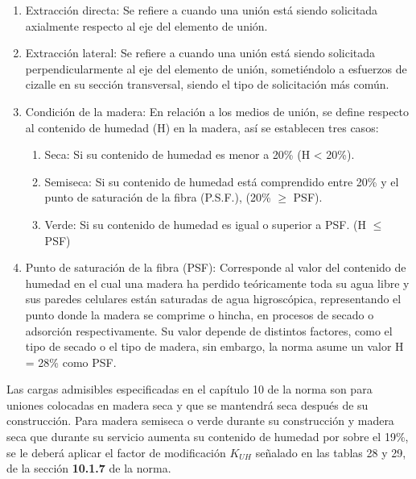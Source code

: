 \begin{enumerate}
		\item Extracción directa: Se refiere a cuando una unión está siendo solicitada axialmente respecto al eje del elemento de unión. 
		\item Extracción lateral: Se refiere a cuando una unión está siendo solicitada perpendicularmente al eje del elemento de unión, sometiéndolo a esfuerzos de cizalle en su sección transversal, siendo el tipo de solicitación más común.
		\item Condición de la madera: En relación a los medios de unión, se define respecto al contenido de humedad (H) en la madera, así se establecen tres casos:
		\begin{enumerate}
			\item Seca: Si su contenido de humedad es menor a 20\% (H < 20\%).
			\item Semiseca: Si su contenido de humedad está comprendido entre 20\% y el punto de saturación de la fibra (P.S.F.), (20\% $\geq$  PSF).
			\item Verde: Si su contenido de humedad es igual o superior a PSF. (H $\leq$ PSF)
		\end{enumerate}
		\item Punto de saturación de la fibra (PSF): Corresponde al valor del contenido de humedad en el cual una madera ha perdido teóricamente toda su agua libre y sus paredes celulares están saturadas de agua higroscópica, representando el punto donde la madera se comprime o hincha, en procesos de secado o adsorción respectivamente. Su valor depende de distintos factores, como el tipo de secado o el tipo de madera, sin embargo, la norma asume un valor H = 28\% como PSF. \cite{fuentes2000estimacion}
\end{enumerate}

Las cargas admisibles especificadas en el capítulo 10 de la norma son para uniones colocadas en madera seca y que se mantendrá seca después de su construcción. Para madera semiseca o verde durante su construcción y madera seca que durante su servicio aumenta su contenido de humedad por sobre el 19\%, se le deberá aplicar el factor de modificación $K_{UH}$ señalado en las tablas 28 y 29, de la sección \textbf{10.1.7} de la norma.

